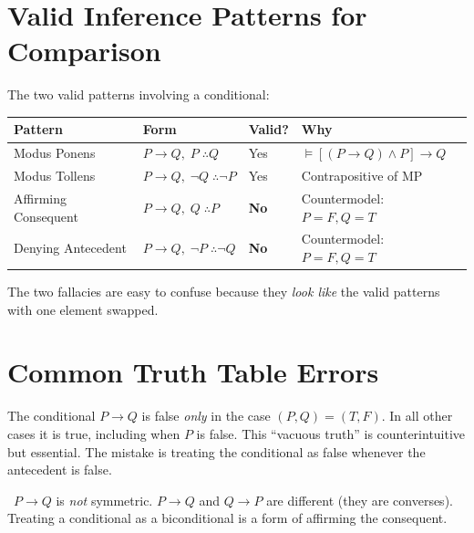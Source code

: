 \section*{Valid Inference Patterns for Comparison}

\begin{remark}\label{def:mp-valid}\label{def:mt-valid}
The two valid patterns involving a conditional:
\begin{center}
\renewcommand{\arraystretch}{1.3}
\begin{tabular}{llll}
\toprule
\textbf{Pattern} & \textbf{Form} & \textbf{Valid?} & \textbf{Why} \\
\midrule
Modus Ponens & $P\to Q,\; P \;\therefore Q$ & Yes & $\models[(P\to Q)\wedge P]\to Q$ \\
Modus Tollens & $P\to Q,\;\neg Q \;\therefore\neg P$ & Yes & Contrapositive of MP \\
Affirming Consequent & $P\to Q,\; Q \;\therefore P$ & \textbf{No} & Countermodel: $P=F, Q=T$ \\
Denying Antecedent & $P\to Q,\;\neg P \;\therefore\neg Q$ & \textbf{No} & Countermodel: $P=F, Q=T$ \\
\bottomrule
\end{tabular}
\end{center}
The two fallacies are easy to confuse because they \emph{look like} the valid
patterns with one element swapped.
\end{remark}

\section*{Common Truth Table Errors}

\begin{remark}\label{rem:cond-error}
The conditional $P \rightarrow Q$ is false \emph{only} in the case
$(P, Q) = (T, F)$. In all other cases it is true, including when $P$ is false.
This ``vacuous truth'' is counterintuitive but essential. The mistake is treating
the conditional as false whenever the antecedent is false.
\end{remark}

\begin{remark}\
$P \rightarrow Q$ is \emph{not} symmetric. $P \rightarrow Q$ and $Q \rightarrow P$
are different (they are converses). Treating a conditional as a biconditional
is a form of affirming the consequent.
\end{remark}

